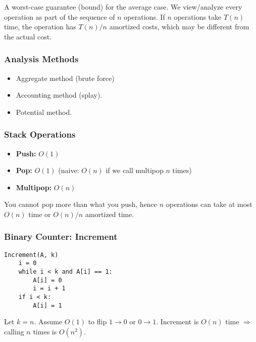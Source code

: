 \begin{definition}
A worst-case guarantee (bound) for the average case. We view/analyze every operation as part of the sequence of $n$ operations. If $n$ operations take $T(n)$ time, the operation has $T(n)/n$ amortized costs, which may be different from the actual cost.
\end{definition}

\subsubsection{Analysis Methods}
\begin{itemize}
    \item Aggregate method (brute force)
    \item Accounting method (splay).
    \item Potential method.
\end{itemize}

\subsubsection{Stack Operations}
\begin{itemize}
    \item \textbf{Push:} $O(1)$
    \item \textbf{Pop:} $O(1)$ (naive: $O(n)$ if we call multipop $n$ times)
    \item \textbf{Multipop:} $O(n)$
\end{itemize}

\begin{warning}
    You cannot pop more than what you push, hence $n$ operations can take at most $O(n)$ time or $O(n)/n$ amortized time.
\end{warning}

\subsubsection{Binary Counter: Increment}
\begin{lstlisting}
Increment(A, k)
    i = 0
    while i < k and A[i] == 1:
        A[i] = 0
        i = i + 1
    if i < k:
        A[i] = 1
\end{lstlisting}

\begin{warning}
    Let $k = n$. Assume $O(1)$ to flip $1 \rightarrow 0$ or $0 \rightarrow 1$. Increment is $O(n)$ time $\Rightarrow$ calling $n$ times is $O(n^2)$.
\end{warning}

